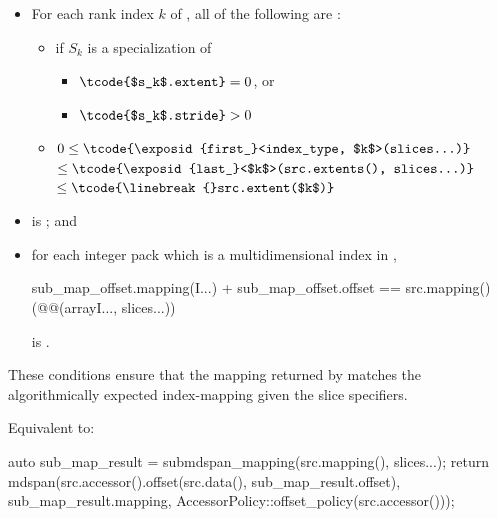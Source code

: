 \begin{itemdescr}
\pnum
\expects
\begin{itemize}
\item
For each rank index $k$ of ,
all of the following are :
  \begin{itemize}
  \item
  if $S_k$ is a specialization of 
    \begin{itemize}
    \item $\tcode{$s_k$.extent} = 0$, or
    \item $\tcode{$s_k$.stride} > 0$
    \end{itemize}
  \item
  $0 \le \tcode{\exposid{first_}<index_type, $k$>(slices...)}$
  $\le \tcode{\exposid{last_}<$k$>(src.extents(), slices...)}$
  $\le \tcode{\linebreak{}src.extent($k$)}$
  \end{itemize}

\item
{}\linebreak
is ; and

\item
for each integer pack  which is a multidimensional index
in ,
\begin{codeblock}
sub_map_offset.mapping(I...) + sub_map_offset.offset ==
  src.mapping()(@@(array{I...}, slices...))
\end{codeblock}
is .
\end{itemize}

\begin{note}
These conditions ensure that the mapping returned by 
matches the algorithmically expected index-mapping given the slice specifiers.
\end{note}

\pnum
\effects
Equivalent to:
\begin{codeblock}
auto sub_map_result = submdspan_mapping(src.mapping(), slices...);
return mdspan(src.accessor().offset(src.data(), sub_map_result.offset),
              sub_map_result.mapping,
              AccessorPolicy::offset_policy(src.accessor()));
\end{codeblock}
\end{itemdescr}

